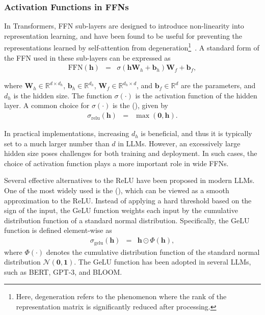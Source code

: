 \subsubsection{Activation Functions in FFNs}

\noindent In Transformers, FFN sub-layers are designed to introduce non-linearity into representation learning, and have been found to be useful for preventing the representations learned by self-attention from degeneration\footnote{Here, degeneration refers to the phenomenon where the rank of the representation matrix is significantly reduced after processing.}~\cite{dong-etal:2021attention}. A standard form of the FFN used in these sub-layers can be expressed as
\begin{eqnarray}
\mathrm{FFN}(\mathbf{h}) & = & \sigma(\mathbf{h} \mathbf{W}_h + \mathbf{b}_h) \mathbf{W}_f + \mathbf{b}_f \label{eq:llm-ffn-basic},
\end{eqnarray}

\noindent where $\mathbf{W}_h \in \mathbb{R}^{d \times d_h}$, $\mathbf{b}_h \in \mathbb{R}^{d_h}$, $\mathbf{W}_f \in \mathbb{R}^{d_h \times d}$, and $\mathbf{b}_f \in \mathbb{R}^d$ are the parameters, and $d_h$ is the hidden size. The function $\sigma(\cdot)$ is the activation function of the hidden layer. A common choice for $\sigma(\cdot)$ is the  (), given by
\begin{eqnarray}
\sigma_{\mathrm{relu}}(\mathbf{h}) & = & \max(\mathbf{0}, \mathbf{h}).
\end{eqnarray}

In practical implementations, increasing $d_h$ is beneficial, and thus it is typically set to a much larger number than $d$ in LLMs. However, an excessively large hidden size poses challenges for both training and deployment. In such cases, the choice of activation function plays a more important role in wide FFNs.

Several effective alternatives to the ReLU have been proposed in modern LLMs. One of the most widely used is the  (), which can be viewed as a smooth approximation to the ReLU. Instead of applying a hard threshold based on the sign of the input, the GeLU function weights each input by the cumulative distribution function of a standard normal distribution. Specifically, the GeLU function is defined element-wise as
\begin{eqnarray}
\sigma_{\mathrm{gelu}}(\mathbf{h}) & = & \mathbf{h} \odot \Phi(\mathbf{h}),
\end{eqnarray}
\noindent where $\Phi(\cdot)$ denotes the cumulative distribution function of the standard normal distribution $\mathcal{N}(\mathbf{0},\mathbf{1})$. The GeLU function has been adopted in several LLMs, such as BERT, GPT-3, and BLOOM.

